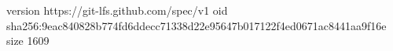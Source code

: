 version https://git-lfs.github.com/spec/v1
oid sha256:9eac840828b774fd6ddecc71338d22e95647b017122f4ed0671ac8441aa9f16e
size 1609
